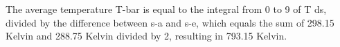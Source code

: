 The average temperature T-bar is equal to the integral from 0 to 9 of T ds, divided by the difference between s-a and s-e, which equals the sum of 298.15 Kelvin and 288.75 Kelvin divided by 2, resulting in 793.15 Kelvin.